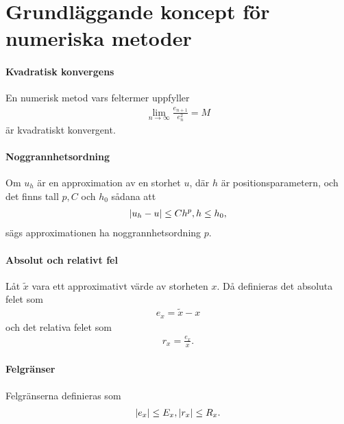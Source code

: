 \section{Grundläggande koncept för numeriska metoder}

\paragraph{Kvadratisk konvergens}
En numerisk metod vars feltermer uppfyller
\begin{align*}
	\lim\limits_{n\to\infty}\frac{e_{n + 1}}{e_{n}^{2}} = M
\end{align*}
är kvadratiskt konvergent.

\paragraph{Noggrannhetsordning}
Om $u_{h}$ är en approximation av en storhet $u$, där $h$ är positionsparametern, och det finns tall $p, C$ och $h_{0}$ sådana att
\begin{align*}
	\abs{u_{h} - u} \leq Ch^{p}, h\leq h_{0},
\end{align*}
sägs approximationen ha noggrannhetsordning $p$.

\paragraph{Absolut och relativt fel}
Låt $\tilde{x}$ vara ett approximativt värde av storheten $x$. Då definieras det absoluta felet som
\begin{align*}
	e_{x} = \tilde{x} - x
\end{align*}
och det relativa felet som
\begin{align*}
	r_{x} = \frac{e_{x}}{x}.
\end{align*}

\paragraph{Felgränser}
Felgränserna definieras som
\begin{align*}
	\abs{e_{x}} \leq E_{x}, \abs{r_{x}} \leq R_{x}.
\end{align*}


